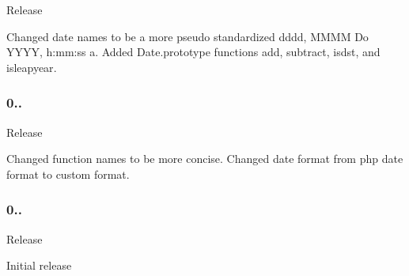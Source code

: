 \begin{DoxyItemize}
\item Release
\end{DoxyItemize}

Changed date names to be a more pseudo standardized \textquotesingle{}dddd, M\+M\+MM Do Y\+Y\+YY, h\+:mm\+:ss a\textquotesingle{}. Added {\ttfamily Date.\+prototype} functions {\ttfamily add}, {\ttfamily subtract}, {\ttfamily isdst}, and {\ttfamily isleapyear}.

\subsubsection*{0..}


\begin{DoxyItemize}
\item Release
\end{DoxyItemize}

Changed function names to be more concise. Changed date format from php date format to custom format.

\subsubsection*{0..}


\begin{DoxyItemize}
\item Release
\end{DoxyItemize}

Initial release 